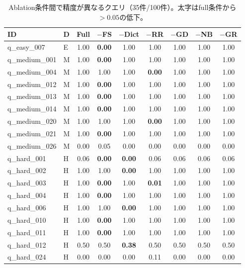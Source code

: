 \documentclass[5p,twocolumn]{elsarticle}
\begin{document}
\begin{table}[htbp]
\centering
\caption{Ablation条件間で精度が異なるクエリ（35件/100件）。太字はfull条件から$> 0.05$の低下。}
\label{tab:sup_ablation_diff}
\scriptsize
\begin{tabular}{@{}llccccccc@{}}
  \toprule
  ID & D & Full & $-$FS & $-$Dict & $-$RR & $-$GD & $-$NB & $-$GR \\
  \midrule
    q\_easy\_007 & E & 1.00 & \textbf{0.00} & 1.00 & 1.00 & 1.00 & 1.00 & 1.00 \\
    q\_medium\_001 & M & 1.00 & \textbf{0.00} & 1.00 & 1.00 & 1.00 & 1.00 & 1.00 \\
    q\_medium\_004 & M & 1.00 & 1.00 & 1.00 & \textbf{0.00} & 1.00 & 1.00 & 1.00 \\
    q\_medium\_012 & M & 1.00 & \textbf{0.00} & 1.00 & 1.00 & 1.00 & 1.00 & 1.00 \\
    q\_medium\_013 & M & 1.00 & \textbf{0.00} & 1.00 & 1.00 & 1.00 & 1.00 & 1.00 \\
    q\_medium\_014 & M & 1.00 & \textbf{0.00} & 1.00 & 1.00 & 1.00 & 1.00 & 1.00 \\
    q\_medium\_020 & M & 1.00 & 1.00 & 1.00 & \textbf{0.00} & 1.00 & 1.00 & 1.00 \\
    q\_medium\_021 & M & 1.00 & \textbf{0.00} & 1.00 & 1.00 & 1.00 & 1.00 & 1.00 \\
    q\_medium\_026 & M & 0.00 & 0.05 & 0.00 & 0.00 & 0.00 & 0.00 & 0.00 \\
    q\_hard\_001 & H & 0.06 & \textbf{0.00} & \textbf{0.00} & 0.06 & 0.06 & 0.06 & 0.06 \\
    q\_hard\_002 & H & 1.00 & 1.00 & \textbf{0.00} & 1.00 & 1.00 & 1.00 & 1.00 \\
    q\_hard\_003 & H & 1.00 & \textbf{0.00} & 1.00 & \textbf{0.01} & 1.00 & 1.00 & 1.00 \\
    q\_hard\_004 & H & 1.00 & \textbf{0.00} & 1.00 & 1.00 & 1.00 & 1.00 & 1.00 \\
    q\_hard\_006 & H & 1.00 & 1.00 & \textbf{0.00} & 1.00 & 1.00 & 1.00 & 1.00 \\
    q\_hard\_010 & H & 1.00 & \textbf{0.00} & 1.00 & 1.00 & 1.00 & 1.00 & 1.00 \\
    q\_hard\_011 & H & 1.00 & \textbf{0.00} & 1.00 & 1.00 & 1.00 & 1.00 & 1.00 \\
    q\_hard\_012 & H & 0.50 & 0.50 & \textbf{0.38} & 0.50 & 0.50 & 0.50 & 0.50 \\
    q\_hard\_024 & H & 0.00 & 0.00 & 0.00 & 0.11 & 0.00 & 0.00 & 0.00 \\

\end{tabular}
\end{table}
\end{document}
